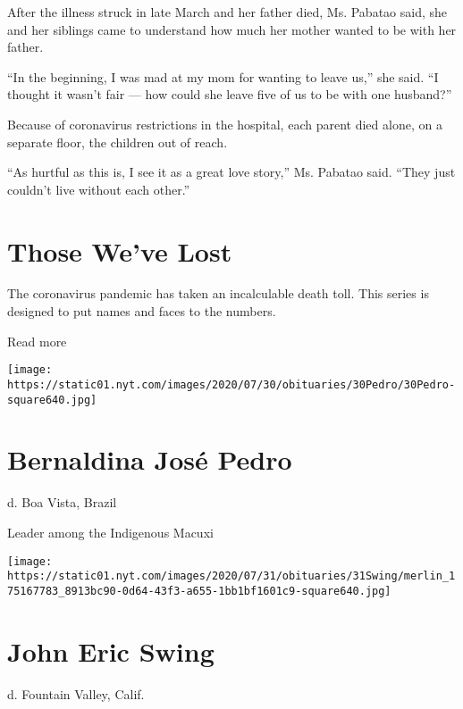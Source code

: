 After the illness struck in late March and her father died, Ms. Pabatao
said, she and her siblings came to understand how much her mother wanted
to be with her father.

``In the beginning, I was mad at my mom for wanting to leave us,'' she
said. ``I thought it wasn't fair --- how could she leave five of us to
be with one husband?''

Because of coronavirus restrictions in the hospital, each parent died
alone, on a separate floor, the children out of reach.

``As hurtful as this is, I see it as a great love story,'' Ms. Pabatao
said. ``They just couldn't live without each other.''

\href{https://www.nytimes.com/interactive/2020/obituaries/people-died-coronavirus-obituaries.html?action=click\&pgtype=Article\&state=default\&region=BELOW_MAIN_CONTENT\&context=covid_obits_promo}{}

\hypertarget{those-weve-lost}{%
\section{Those We've Lost}\label{those-weve-lost}}

The coronavirus pandemic has taken an incalculable death toll. This
series is designed to put names and faces to the numbers.

Read more

\texttt{[image: https://static01.nyt.com/images/2020/07/30/obituaries/30Pedro/30Pedro-square640.jpg]}

\hypertarget{bernaldina-josuxe9-pedro}{%
\section{Bernaldina José Pedro}\label{bernaldina-josuxe9-pedro}}

d. Boa Vista, Brazil

Leader among the Indigenous Macuxi

\texttt{[image: https://static01.nyt.com/images/2020/07/31/obituaries/31Swing/merlin\_175167783\_8913bc90-0d64-43f3-a655-1bb1bf1601c9-square640.jpg]}

\hypertarget{john-eric-swing}{%
\section{John Eric Swing}\label{john-eric-swing}}

d. Fountain Valley, Calif.


